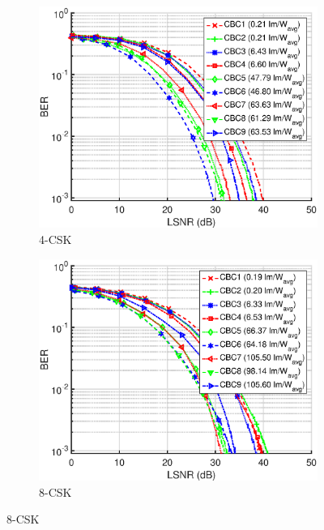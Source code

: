 \documentclass[10pt,letterpaper]{article}
\begin{document}
\begin{figure}[b]
	\centering
		\begin{subfigure}{0.49\textwidth}
		\centering
			\includegraphics[trim={0.1in 0.0in 0.5in 0.1in}, clip=true, width=\textwidth]{M04_4-CSK_BERvsLSNR_NL.eps}
			\caption{4-CSK}
			\label{fig4LSNR}
		\end{subfigure}
		\hfill
		\begin{subfigure}{0.49\textwidth}
		\centering
			\includegraphics[trim={0.1in 0.0in 0.5in 0.1in}, clip=true, width=\textwidth]{M08_8-CSK_BERvsLSNR_NL.eps}
			\caption{8-CSK}
			\label{fig8LSNR}
		\end{subfigure}

\end{figure}
\end{document}
